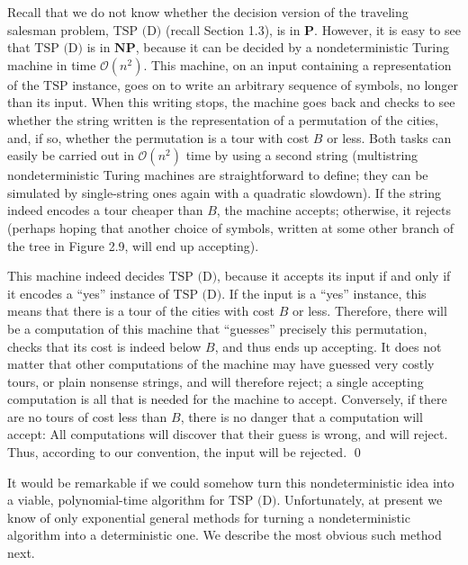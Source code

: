 \documentclass[12pt]{article}
\begin{document}
\begin{tcolorbox}[colback=white, colframe=black, title=Example]
  Recall that we do not know whether the decision version of the traveling salesman problem, $\text{TSP (D)}$ (recall Section 1.3), is in $\textbf{P}$. However, it is easy to see that $\text{TSP (D)}$ is in $\textbf{NP}$, because it can be decided by a nondeterministic Turing machine in time $\mathcal{O}(n^2)$. This machine, on an input containing a representation of the $\text{TSP}$ instance, goes on to write an arbitrary sequence of symbols, no longer than its input. When this writing stops, the machine goes back and checks to see whether the string written is the representation of a permutation of the cities, and, if so, whether the permutation is a tour with cost $B$ or less. Both tasks can easily be carried out in $\mathcal{O}(n^2)$ time by using a second string (multistring nondeterministic Turing machines are straightforward to define; they can be simulated by single-string ones again with a quadratic slowdown). If the string indeed encodes a tour cheaper than $B$, the machine accepts; otherwise, it rejects (perhaps hoping that another choice of symbols, written at some other branch of the tree in Figure 2.9, will end up accepting).
  
  This machine indeed decides $\text{TSP (D)}$, because it accepts its input if and only if it encodes a ``yes'' instance of $\text{TSP (D)}$. If the input is a ``yes'' instance, this means that there is a tour of the cities with cost $B$ or less. Therefore, there will be a computation of this machine that ``guesses'' precisely this permutation, checks that its cost is indeed below $B$, and thus ends up accepting. It does not matter that other computations of the machine may have guessed very costly tours, or plain nonsense strings, and will therefore reject; a single accepting computation is all that is needed for the machine to accept. Conversely, if there are no tours of cost less than $B$, there is no danger that a computation will accept: All computations will discover that their guess is wrong, and will reject. Thus, according to our convention, the input will be rejected. \qed
  \end{tcolorbox}
  
  It would be remarkable if we could somehow turn this nondeterministic idea into a viable, polynomial-time algorithm for $\text{TSP (D)}$. Unfortunately, at present we know of only exponential general methods for turning a nondeterministic algorithm into a deterministic one. We describe the most obvious such method next.
\end{document}
